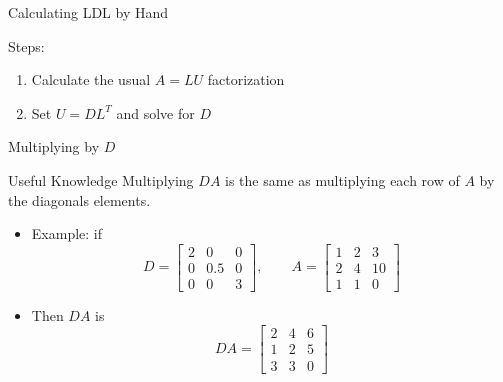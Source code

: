 \documentclass[10pt]{beamer}
\begin{document}

\begin{frame}{Calculating LDL by Hand}

Steps:
\begin{enumerate}
    \item Calculate the usual $A=LU$ factorization 

    \item Set $U = DL^T$ and solve for $D$
\end{enumerate}
\vfill 
{}
\vfill
\end{frame}

\begin{frame}{Multiplying by $D$}

\begin{block}{Useful Knowledge}
    Multiplying $DA$ is the same as multiplying each row of $A$ by the diagonals elements.
\end{block}

\begin{itemize}
    \item Example: if 
    $$
    D = \begin{bmatrix}
            2 & 0 & 0\\
            0 & 0.5 & 0 \\
            0 & 0 & 3
        \end{bmatrix},\qquad
         A = \begin{bmatrix}
            1 & 2 & 3\\
            2 & 4 & 10 \\
            1 & 1 & 0
        \end{bmatrix}
    $$
    \item Then $DA$ is
        $$
    DA = \begin{bmatrix}
            2 & 4 & 6\\
            1 & 2 & 5 \\
            3 & 3 & 0
        \end{bmatrix}
    $$
\end{itemize}
    
\end{frame}
\end{document}

